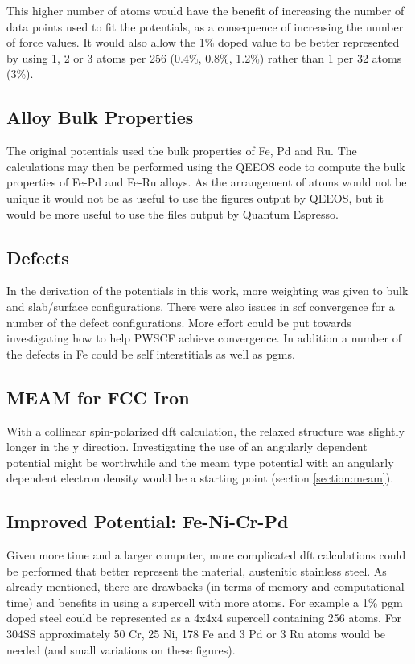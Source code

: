 This higher number of atoms would have the benefit of increasing the number of data points used to fit the potentials, as a consequence of increasing the number of force values.  It would also allow the 1\% doped value to be better represented by using 1, 2 or 3 atoms per 256 (0.4\%, 0.8\%, 1.2\%) rather than 1 per 32 atoms (3\%).

\subsection{Alloy Bulk Properties}

The original potentials used the bulk properties of Fe, Pd and Ru.  The calculations may then be performed using the QEEOS code to compute the bulk properties of Fe-Pd and Fe-Ru alloys.  As the arrangement of atoms would not be unique it would not be as useful to use the figures output by QEEOS, but it would be more useful to use the files output by Quantum Espresso.  

\subsection{Defects}

In the derivation of the potentials in this work, more weighting was given to bulk and slab/surface configurations.  There were also issues in \acrshort{scf} convergence for a number of the defect configurations.  More effort could be put towards investigating how to help PWSCF achieve convergence.  In addition a number of the defects in Fe could be self interstitials as well as \acrshort{pgm}s.

\subsection{MEAM for FCC Iron}

With a collinear spin-polarized \acrshort{dft} calculation, the relaxed structure was slightly longer in the y direction.  Investigating the use of an angularly dependent potential might be worthwhile and the \acrshort{meam} type potential with an angularly dependent electron density would be a starting point (section \ref{section:meam}).

\subsection{Improved Potential: Fe-Ni-Cr-Pd}

Given more time and a larger computer, more complicated \acrshort{dft} calculations could be performed that better represent the material, austenitic stainless steel.  As already mentioned, there are drawbacks (in terms of memory and computational time) and benefits in using a supercell with more atoms.  For example a 1\% \acrshort{pgm} doped steel could be represented as a 4x4x4 supercell containing 256 atoms.  For \gls{304SS} approximately 50 Cr, 25 Ni, 178 Fe and 3 Pd or 3 Ru atoms would be needed (and small variations on these figures).

